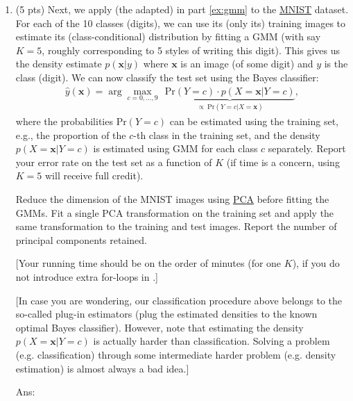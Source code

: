 \documentclass[10pt,letterpaper]{article}
\newcommand{\xv}{\mathbf{x}}
\newcommand{\red}[1]{{\color{red}#1}}
\newcommand{\magenta}[1]{{\color{magenta}#1}}
\newcommand{\eg}{{e.g.}\xspace}
\newcommand{\ans}[1]{{\color{orange}\textsf{Ans}: #1}}
\begin{document}
\begin{exercise}
\begin{enumerate}[label=\alph*)]
  \item (5 pts) Next, we apply (the adapted)  in part \ref{ex:gmm} to the \href{https://pytorch.org/vision/0.9/datasets.html#mnist}{\magenta{MNIST}} dataset. For each of the 10 classes (digits), we can use its (only its) training images to estimate its (class-conditional) distribution by fitting a GMM (with say $K=5$, roughly corresponding to 5 styles of writing this digit). This gives us the density estimate $p(\xv | y)$ where $\xv$ is an image (of some digit) and $y$ is the class (digit). We can now classify the test set using the Bayes classifier:
		\begin{align}
		\hat y(\xv) = \arg\max_{c = 0, \ldots, 9} ~~ \underbrace{\mathrm{Pr}(Y = c) \cdot p(X = \xv | Y = c)}_{\propto ~\mathrm{Pr}(Y=c | X=\xv)},
		\end{align}
		where the probabilities $\mathrm{Pr}(Y = c)$ can be estimated using the training set, \eg, the proportion of the $c$-th class in the training set, and the \red{density} $p(X = \xv | Y = c)$ is estimated using GMM for each class $c$ separately. Report your error rate on the test set as a function of $K$ (if time is a concern, using $K=5$ will receive  full credit).

		Reduce the dimension of the MNIST images using \href{https://en.wikipedia.org/wiki/Principal_component_analysis}{\magenta{PCA}} before fitting the GMMs. Fit a single PCA transformation on the training set and apply the same transformation to the training and test images. Report the number of principal components retained.

        [Your running time should be on the order of minutes (for one $K$), if you do not introduce extra for-loops in .]

		[In case you are wondering, our classification procedure above belongs to the so-called plug-in estimators (plug the estimated densities to the known optimal Bayes classifier). However, note that estimating the density $p(X=\xv | Y = c)$ is actually harder than classification. Solving a problem (\eg classification) through some intermediate harder problem (\eg density estimation) is almost always a bad idea.]

		\ans{}


	\end{enumerate}
\end{exercise}
\end{document}
